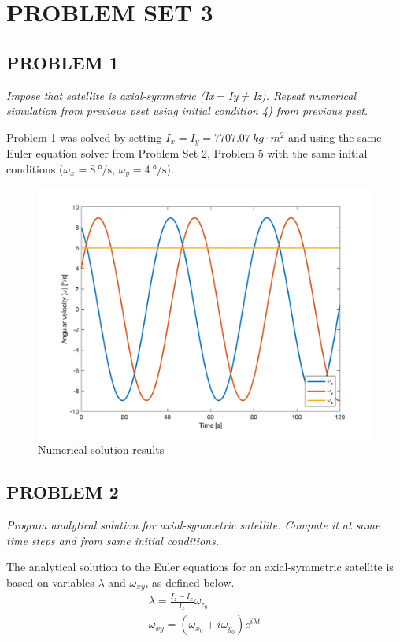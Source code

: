 \section{\Large PROBLEM SET 3}
\subsection{PROBLEM 1}
\textit{Impose that satellite is axial-symmetric (Ix$=$Iy$\neq$Iz). Repeat numerical simulation from previous pset using initial condition 4) from previous pset.}

Problem 1 was solved by setting $I_{x} = I_{y} = \qty{7707.07}{kg \cdot m^2}$ and using the same Euler equation solver from Problem Set 2, Problem 5 with the same initial conditions ($\omega_{x} = \qty{8}{\degree\per\second}$, $\omega_{y} = \qty{4}{\degree\per\second}$).

\begin{figure}[H]
\centering
\includegraphics[scale=0.6]{Images/ps3_problem1.png}
\caption{Numerical solution results}
\label{fig:ps3_problem1}
\end{figure}


\subsection{PROBLEM 2}
\textit{Program analytical solution for axial-symmetric satellite. Compute it at same time steps and from same initial conditions.}

The analytical solution to the Euler equations for an axial-symmetric satellite is based on variables $\lambda$ and $\omega_{xy}$, as defined below.
\begin{align*}
    \lambda = \frac{I_{z} - I_{x}}{I_{x}} \omega_{z_{0}} \\
    \omega_{xy} = (\omega_{x_{0}} + i \omega_{y_{0}}) e^{i \lambda t}
\end{align*}

